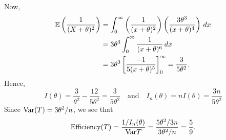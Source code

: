 \begin{example}
\begin{solution}
\eit
Now,
\begin{align*}
\mathbb{E}\left(\frac{1}{(X+\theta)^2}\right)
	& = \int_0^\infty \left(\frac{1}{(x+\theta)^2}\right)\left(\frac{3\theta^3}{(x+\theta)^4}\right)\,dx \\
	& = 3\theta^3 \int_0^\infty \frac{1}{(x+\theta)^6}\,dx \\
	& = 3\theta^3\left[\frac{-1}{5(x+\theta)^5}\right]_0^\infty
	= \frac{3}{5\theta^2}.
\end{align*}
Hence,
\[
I(\theta) = \frac{3}{\theta^2} - \frac{12}{5\theta^2} = \frac{3}{5\theta^2}
\quad\text{and}\quad
I_n(\theta) = nI(\theta) = \frac{3n}{5\theta^2}
\]
Since $\text{Var}(T)=3\theta^2/n$, we see that
\[
\text{Efficiency}(T) = \frac{1/I_n(\theta)}{\text{Var}{T}} = \frac{5\theta^2/3n}{3\theta^2/n} = \frac{5}{9}.
\]
\een
\end{solution}
\end{example}

